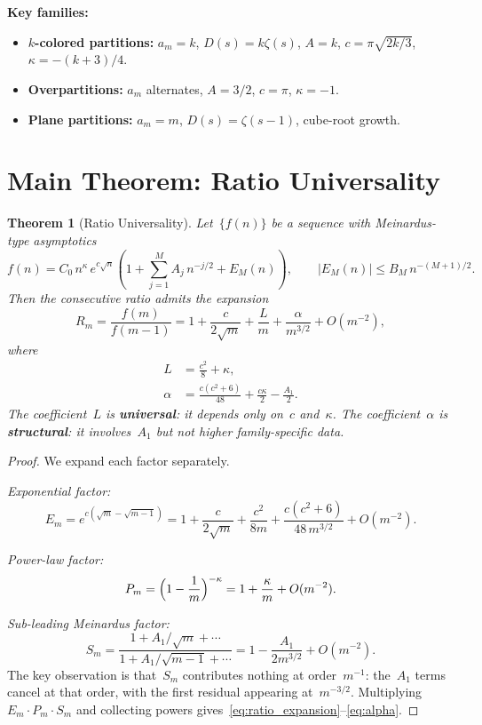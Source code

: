 \documentclass[11pt,a4paper]{article}
\newtheorem{theorem}{Theorem}[section]
\begin{document}
\noindent\textbf{Key families:}
\begin{itemize}
  \item \textbf{$k$-colored partitions:} $a_m = k$, $D(s) = k\zeta(s)$, $A = k$, $c = \pi\sqrt{2k/3}$, $\kappa = -(k+3)/4$.
  \item \textbf{Overpartitions:} $a_m$ alternates, $A = 3/2$, $c = \pi$, $\kappa = -1$.
  \item \textbf{Plane partitions:} $a_m = m$, $D(s) = \zeta(s-1)$, cube-root growth.
\end{itemize}

\section{Main Theorem: Ratio Universality}\label{sec:main}

\begin{theorem}[Ratio Universality]\label{thm:ratio}
Let~$\{f(n)\}$ be a sequence with Meinardus-type asymptotics
\[
  f(n) = C_0\,n^{\kappa}\,e^{c\sqrt{n}}\!\left(1 + \sum_{j=1}^{M} A_j\,n^{-j/2} + E_M(n)\right),
  \qquad |E_M(n)| \leq B_M\,n^{-(M+1)/2}.
\]
Then the consecutive ratio admits the expansion
\begin{equation}\label{eq:ratio_expansion}
  R_m = \frac{f(m)}{f(m-1)} = 1 + \frac{c}{2\sqrt{m}} + \frac{L}{m} + \frac{\alpha}{m^{3/2}} + O(m^{-2}),
\end{equation}
where
\begin{align}
  L &= \frac{c^2}{8} + \kappa, \label{eq:L}\\[4pt]
  \alpha &= \frac{c(c^2+6)}{48} + \frac{c\kappa}{2} - \frac{A_1}{2}. \label{eq:alpha}
\end{align}
The coefficient~$L$ is \textbf{universal}: it depends only on~$c$ and~$\kappa$.
The coefficient~$\alpha$ is \textbf{structural}: it involves~$A_1$ but not higher family-specific data.
\end{theorem}

\begin{proof}
We expand each factor separately.

\emph{Exponential factor:}
\[
  E_m = e^{c(\sqrt{m}-\sqrt{m-1})} = 1 + \frac{c}{2\sqrt{m}} + \frac{c^2}{8m} + \frac{c(c^2+6)}{48\,m^{3/2}} + O(m^{-2}).
\]

\emph{Power-law factor:}
\[
  P_m = \Bigl(1 - \frac{1}{m}\Bigr)^{-\kappa} = 1 + \frac{\kappa}{m} + O(m^{-2}).
\]

\emph{Sub-leading Meinardus factor:}
\[
  S_m = \frac{1 + A_1/\sqrt{m} + \cdots}{1 + A_1/\sqrt{m-1} + \cdots} = 1 - \frac{A_1}{2m^{3/2}} + O(m^{-2}).
\]
The key observation is that~$S_m$ contributes nothing at order~$m^{-1}$: the~$A_1$ terms cancel at that order, with the first residual appearing at~$m^{-3/2}$. Multiplying~$E_m \cdot P_m \cdot S_m$ and collecting powers gives~\eqref{eq:ratio_expansion}--\eqref{eq:alpha}.
\end{proof}
\end{document}
